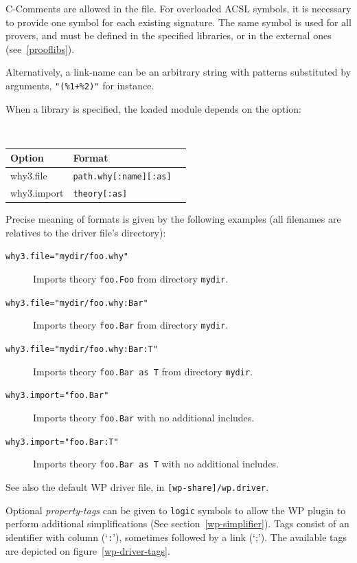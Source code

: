 \textsf{C}-Comments are allowed in the file. For overloaded
\textsf{ACSL} symbols, it is necessary to provide one  symbol for
each existing signature. The same  symbol is used for all provers,
and must be defined in the specified libraries, or in the external
ones (see~\ref{prooflibs}).

Alternatively, a link-name can be an arbitrary string
with patterns substituted by arguments, \verb="(%1+%2)"= for instance.

When a library  is specified, the loaded module depends on the
option:
\begin{center}\tt
  \begin{tabular}{lll}
    \textrm{Option} & \textrm{Format} \\
    \hline
    why3.file & \verb+path.why[:name][:as]+ \\
    why3.import & \verb+theory[:as]+ \\
  \end{tabular}
\end{center}

Precise meaning of formats is given by the following examples (all filenames are relatives to the driver file's directory):
\begin{description}
\item[\tt why3.file="mydir/foo.why"] Imports theory \verb+foo.Foo+ from directory \verb+mydir+.
\item[\tt why3.file="mydir/foo.why:Bar"] Imports theory \verb+foo.Bar+ from directory \verb+mydir+.
\item[\tt why3.file="mydir/foo.why:Bar:T"] Imports theory \verb+foo.Bar as T+ from directory \verb+mydir+.
\item[\tt why3.import="foo.Bar"] Imports theory \verb+foo.Bar+ with no additional includes.
\item[\tt why3.import="foo.Bar:T"] Imports theory \verb+foo.Bar as T+ with no additional includes.
\end{description}

See also the default \textsf{WP} driver file, in \verb+[wp-share]/wp.driver+.

Optional \textit{property-tags} can be given to
\texttt{logic}  symbols to allow the \textsf{WP} plugin to perform
additional simplifications (See section~\ref{wp-simplifier}).  Tags
consist of an identifier with column (`\verb+:+'), sometimes followed
by a link (`;'). The available tags are depicted on figure~\ref{wp-driver-tags}.

